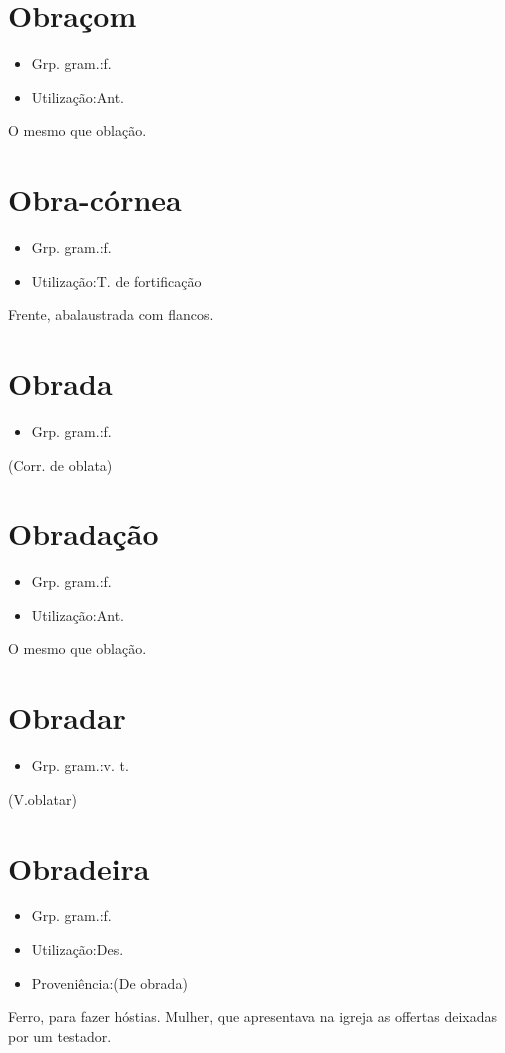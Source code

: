 \section{Obraçom}
\begin{itemize}
\item {Grp. gram.:f.}
\end{itemize}
\begin{itemize}
\item {Utilização:Ant.}
\end{itemize}
O mesmo que \textunderscore oblação\textunderscore .
\section{Obra-córnea}
\begin{itemize}
\item {Grp. gram.:f.}
\end{itemize}
\begin{itemize}
\item {Utilização:T. de fortificação}
\end{itemize}
Frente, abalaustrada com flancos.
\section{Obrada}
\begin{itemize}
\item {Grp. gram.:f.}
\end{itemize}
(Corr. de \textunderscore oblata\textunderscore )
\section{Obradação}
\begin{itemize}
\item {Grp. gram.:f.}
\end{itemize}
\begin{itemize}
\item {Utilização:Ant.}
\end{itemize}
O mesmo que \textunderscore oblação\textunderscore .
\section{Obradar}
\begin{itemize}
\item {Grp. gram.:v. t.}
\end{itemize}
(V.oblatar)
\section{Obradeira}
\begin{itemize}
\item {Grp. gram.:f.}
\end{itemize}
\begin{itemize}
\item {Utilização:Des.}
\end{itemize}
\begin{itemize}
\item {Proveniência:(De \textunderscore obrada\textunderscore )}
\end{itemize}
Ferro, para fazer hóstias.
Mulher, que apresentava na igreja as offertas deixadas por um testador.
